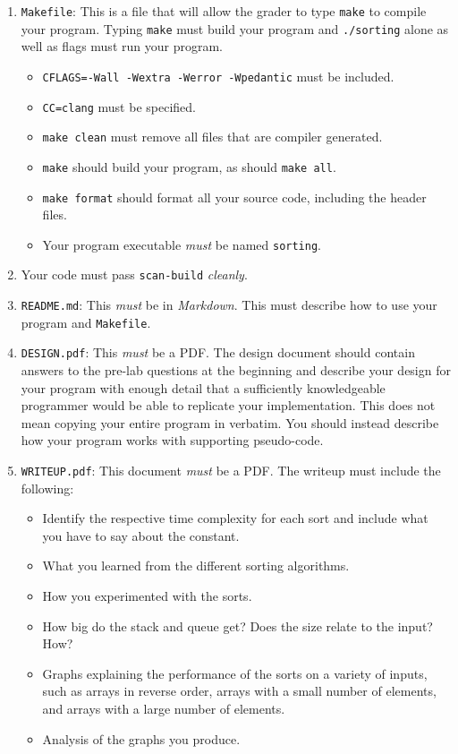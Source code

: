 \documentclass[11pt]{article}
\begin{document}
\begin{enumerate}
  \item \texttt{Makefile}: This is a file that will allow the grader to
    type \texttt{make} to compile your program. Typing \texttt{make}
    must build your program and \texttt{./sorting} alone as well as
    flags must run your program.

    \begin{itemize}
      \item \texttt{CFLAGS=-Wall -Wextra -Werror -Wpedantic}
        must be included.
      \item \texttt{CC=clang} must be specified.
      \item \texttt{make clean} must remove all files that are compiler
        generated.
      \item \texttt{make} should build your program, as should
        \texttt{make all}.
      \item \texttt{make format} should format all your source code,
        including the header files.
      \item Your program executable \emph{must} be named
        \texttt{sorting}.
    \end{itemize}

  \item Your code must pass \texttt{scan-build} \emph{cleanly}.

  \item \texttt{README.md}: This \emph{must} be in \emph{Markdown}.
    This must describe how to use your program and \texttt{Makefile}.

  \item \texttt{DESIGN.pdf}: This \emph{must} be a PDF. The design
    document should contain answers to the pre-lab questions at the
    beginning and describe your design for your program with enough
    detail that a sufficiently knowledgeable programmer would be able to
    replicate your implementation. This does not mean copying your
    entire program in verbatim. You should instead describe how your
    program works with supporting pseudo-code.

  \item \texttt{WRITEUP.pdf}: This document \emph{must} be a PDF. The
    writeup must include the following:
    \begin{itemize}
      \item Identify the respective time complexity for each sort and
        include what you have to say about the constant.
      \item What you learned from the different sorting algorithms.
      \item How you experimented with the sorts.
      \item How big do the stack and queue get? Does the size relate to
        the input? How?
      \item Graphs explaining the performance of the sorts on a variety
        of inputs, such as arrays in reverse order, arrays with a small
        number of elements, and arrays with a large number of elements.
      \item Analysis of the graphs you produce.
    \end{itemize}
\end{enumerate}
\end{document}
